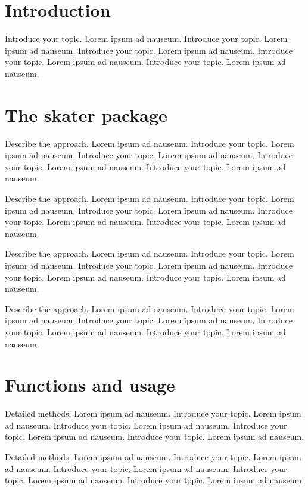 \documentclass{bioinfo}
\begin{document}
\maketitle

\section{Introduction}

Introduce your topic. Lorem ipsum ad nauseum. Introduce your topic.
Lorem ipsum ad nauseum. Introduce your topic. Lorem ipsum ad nauseum.
Introduce your topic. Lorem ipsum ad nauseum. Introduce your topic.
Lorem ipsum ad nauseum.

\section{The skater package}

Describe the approach. Lorem ipsum ad nauseum. Introduce your topic.
Lorem ipsum ad nauseum. Introduce your topic. Lorem ipsum ad nauseum.
Introduce your topic. Lorem ipsum ad nauseum. Introduce your topic.
Lorem ipsum ad nauseum.

Describe the approach. Lorem ipsum ad nauseum. Introduce your topic.
Lorem ipsum ad nauseum. Introduce your topic. Lorem ipsum ad nauseum.
Introduce your topic. Lorem ipsum ad nauseum. Introduce your topic.
Lorem ipsum ad nauseum.

Describe the approach. Lorem ipsum ad nauseum. Introduce your topic.
Lorem ipsum ad nauseum. Introduce your topic. Lorem ipsum ad nauseum.
Introduce your topic. Lorem ipsum ad nauseum. Introduce your topic.
Lorem ipsum ad nauseum.

Describe the approach. Lorem ipsum ad nauseum. Introduce your topic.
Lorem ipsum ad nauseum. Introduce your topic. Lorem ipsum ad nauseum.
Introduce your topic. Lorem ipsum ad nauseum. Introduce your topic.
Lorem ipsum ad nauseum.

\section{Functions and usage}

Detailed methods. Lorem ipsum ad nauseum. Introduce your topic. Lorem
ipsum ad nauseum. Introduce your topic. Lorem ipsum ad nauseum.
Introduce your topic. Lorem ipsum ad nauseum. Introduce your topic.
Lorem ipsum ad nauseum.

Detailed methods. Lorem ipsum ad nauseum. Introduce your topic. Lorem
ipsum ad nauseum. Introduce your topic. Lorem ipsum ad nauseum.
Introduce your topic. Lorem ipsum ad nauseum. Introduce your topic.
Lorem ipsum ad nauseum.
\end{document}
